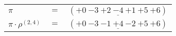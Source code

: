 \begin{example}\label{example:DCRMAYUA}
  \hfill
  \begin{\position}
    \begin{tabular}{lll}
      $\pi$ & $=$ & $({+0}~{-3}~\underline{{+2}~{-4}~{+1}}~{+5}~{+6})$ \\
      $\pi \cdot \rho^{(2,4)}$ & $=$ & $({+0}~{-3}~\underline{{-1}~{+4}~{-2}}~{+5}~{+6})$ \\
    \end{tabular}
  \end{\position}
\end{example}